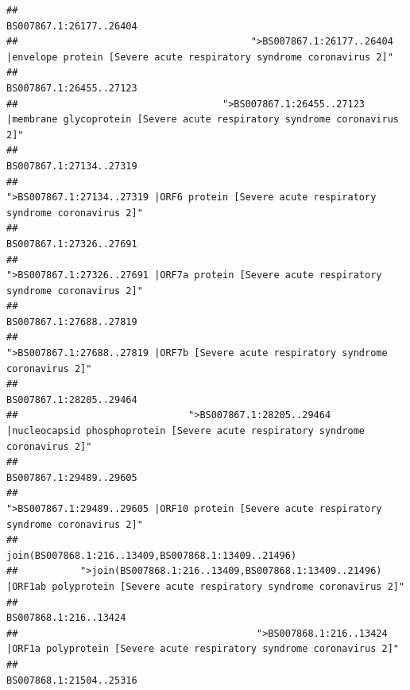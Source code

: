 \documentclass[
]{article}
\begin{document}
\begin{verbatim}
##                                                                                                                BS007867.1:26177..26404 
##                                         ">BS007867.1:26177..26404 |envelope protein [Severe acute respiratory syndrome coronavirus 2]" 
##                                                                                                                BS007867.1:26455..27123 
##                                    ">BS007867.1:26455..27123 |membrane glycoprotein [Severe acute respiratory syndrome coronavirus 2]" 
##                                                                                                                BS007867.1:27134..27319 
##                                             ">BS007867.1:27134..27319 |ORF6 protein [Severe acute respiratory syndrome coronavirus 2]" 
##                                                                                                                BS007867.1:27326..27691 
##                                            ">BS007867.1:27326..27691 |ORF7a protein [Severe acute respiratory syndrome coronavirus 2]" 
##                                                                                                                BS007867.1:27688..27819 
##                                                    ">BS007867.1:27688..27819 |ORF7b [Severe acute respiratory syndrome coronavirus 2]" 
##                                                                                                                BS007867.1:28205..29464 
##                              ">BS007867.1:28205..29464 |nucleocapsid phosphoprotein [Severe acute respiratory syndrome coronavirus 2]" 
##                                                                                                                BS007867.1:29489..29605 
##                                            ">BS007867.1:29489..29605 |ORF10 protein [Severe acute respiratory syndrome coronavirus 2]" 
##                                                                                    join(BS007868.1:216..13409,BS007868.1:13409..21496) 
##           ">join(BS007868.1:216..13409,BS007868.1:13409..21496) |ORF1ab polyprotein [Severe acute respiratory syndrome coronavirus 2]" 
##                                                                                                                  BS007868.1:216..13424 
##                                          ">BS007868.1:216..13424 |ORF1a polyprotein [Severe acute respiratory syndrome coronavirus 2]" 
##                                                                                                                BS007868.1:21504..25316 

\end{verbatim}
\end{document}
